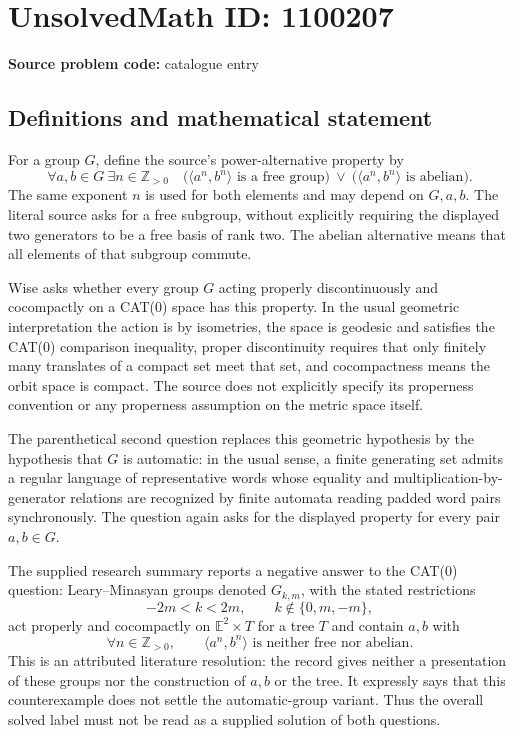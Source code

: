 \documentclass[11pt]{article}
\newcommand{\Z}{\mathbb{Z}}
\begin{document}
\section*{UnsolvedMath ID: 1100207}
\textbf{Source problem code:} catalogue entry
\subsection{Definitions and mathematical statement}
For a group $G$, define the source's power-alternative property by
\[
\forall a,b\in G\ \exists n\in\Z_{>0}\quad
\bigl(\langle a^n,b^n\rangle\text{ is a free group}\bigr)
\ \lor\ 
\bigl(\langle a^n,b^n\rangle\text{ is abelian}\bigr).
\]
The same exponent $n$ is used for both elements and may depend on $G,a,b$. The literal source asks for a free subgroup, without explicitly requiring the displayed two generators to be a free basis of rank two. The abelian alternative means that all elements of that subgroup commute.

Wise asks whether every group $G$ acting properly discontinuously and cocompactly on a CAT(0) space has this property. In the usual geometric interpretation the action is by isometries, the space is geodesic and satisfies the CAT(0) comparison inequality, proper discontinuity requires that only finitely many translates of a compact set meet that set, and cocompactness means the orbit space is compact. The source does not explicitly specify its properness convention or any properness assumption on the metric space itself.

The parenthetical second question replaces this geometric hypothesis by the hypothesis that $G$ is automatic: in the usual sense, a finite generating set admits a regular language of representative words whose equality and multiplication-by-generator relations are recognized by finite automata reading padded word pairs synchronously. The question again asks for the displayed property for every pair $a,b\in G$.

The supplied research summary reports a negative answer to the CAT(0) question: Leary--Minasyan groups denoted $G_{k,m}$, with the stated restrictions
\[
-2m<k<2m,\qquad k\notin\{0,m,-m\},
\]
act properly and cocompactly on $\mathbb E^2\times T$ for a tree $T$ and contain $a,b$ with
\[
\forall n\in\Z_{>0},\qquad
\langle a^n,b^n\rangle\text{ is neither free nor abelian}.
\]
This is an attributed literature resolution: the record gives neither a presentation of these groups nor the construction of $a,b$ or the tree. It expressly says that this counterexample does not settle the automatic-group variant. Thus the overall solved label must not be read as a supplied solution of both questions.
\end{document}
